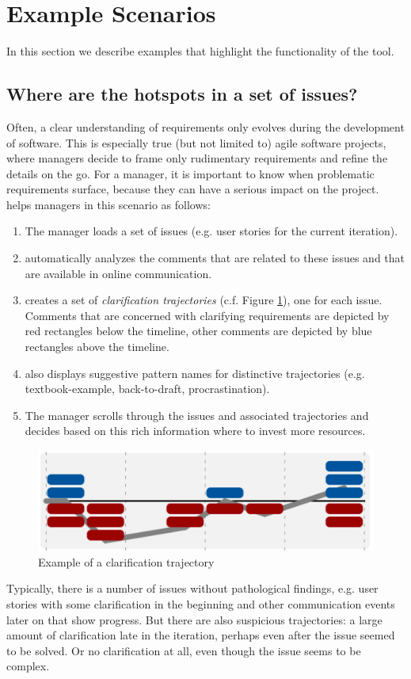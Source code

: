 \section{Example Scenarios}
In this section we describe examples that highlight the functionality of the \viss tool.

\subsection{Where are the hotspots in a set of issues?}
Often, a clear understanding of requirements only evolves during the development of software.
This is especially true (but not limited to) agile software projects, where managers decide to frame only rudimentary requirements and refine the details on the go.
For a manager, it is important to know when problematic requirements surface, because they can have a serious impact on the project.
\viss helps managers in this scenario as follows:
\begin{enumerate}
\item The manager loads a set of issues (e.g. user stories for the current iteration).
\item \viss automatically analyzes the comments that are related to these issues and that are available in online communication.  
\item \viss creates a set of \emph{clarification trajectories} (c.f. Figure \ref{fig:example-trajectory}), one for each issue. 
Comments that are concerned with clarifying requirements are depicted by red rectangles below the timeline, other comments are depicted by blue rectangles above the timeline.
\item \viss also displays suggestive pattern names for distinctive trajectories (e.g. textbook-example, back-to-draft, procrastination).
\item The manager scrolls through the issues and associated trajectories and decides based on this rich information where to invest more resources.
\end{enumerate}
\begin{figure}
\includegraphics[width=\columnwidth]{img/example-trajectory}
\caption{Example of a clarification trajectory}
\label{fig:example-trajectory}
\end{figure}
Typically, there is a number of issues without pathological findings, e.g. user stories with some clarification in the beginning and other communication events later on that show progress. But there are also suspicious trajectories: a large amount of clarification late in the iteration, perhaps even after the issue seemed to be solved. 
Or no clarification at all, even though the issue seems to be complex.

